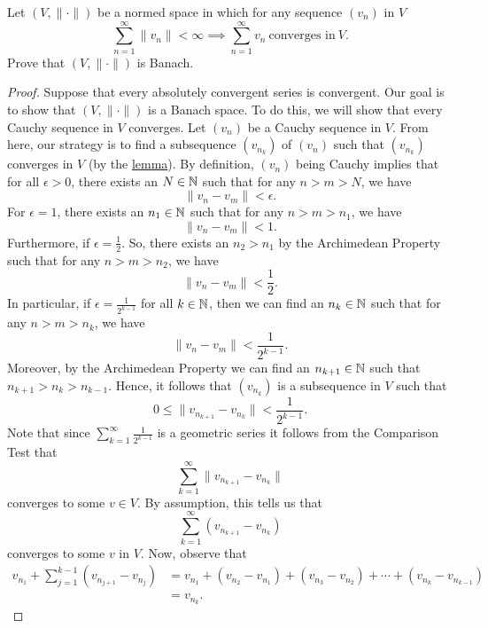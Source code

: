 \documentclass[a4paper]{article}
\begin{document}
\begin{problem}
   Let \( (V, \|\cdot\|) \) be a normed space in which for any sequence \( ({v}_{n}) \) in \( V  \)  
   \[  \sum_{ n=1  }^{ \infty  } \|{v}_{n}\| < \infty \implies \sum_{ n=1  }^{ \infty  } {v}_{n} \ \text{converges in} \ V.  \]
   Prove that \( (V , \|\cdot\|) \) is Banach.
\end{problem}
\begin{proof}
Suppose that every absolutely convergent series is convergent. Our goal is to show that \( (V, \|\cdot\|) \) is a Banach space. To do this, we will show that every Cauchy sequence in \( V  \) converges. Let \( ({v}_{n}) \) be a Cauchy sequence in \( V  \). From here, our strategy is to find a subsequence \( ({v}_{{n}_{k}}) \) of \( ({v}_{n}) \) such that \( ({v}_{{n}_{k}}) \) converges in \( V  \) (by the {\hyperref[lemma]{lemma}}). By definition, \( ({v}_{n}) \) being Cauchy implies that for all \( \epsilon > 0  \), there exists an \( N \in \mathbb{N} \) such that for any \( n > m > N  \), we have 
\[  \|{v}_{n} - {v}_{m}\| < \epsilon. \]
For \( \epsilon = 1 \), there exists an \( {n}_{1} \in \mathbb{N} \) such that for any \( n > m > {n}_{1} \), we have 
\[  \|{v}_{n} - {v}_{m}\| < 1. \]
Furthermore, if \( \epsilon = \frac{ 1 }{ 2 }   \). So, there exists an \( {n}_{2} > {n}_{1} \) by the Archimedean Property such that for any \( n > m > {n}_{2} \), we have 
\[  \|{v}_{n} - {v}_{m}\| < \frac{ 1 }{ 2 }. \] 
In particular, if \( \epsilon = \frac{ 1 }{ 2^{k-1} }   \) for all \( k \in \mathbb{N} \), then we can find an \( {n}_{k} \in \mathbb{N} \) 
such that for any \( n > m > {n}_{k}   \), we have 
\[  \|{v}_{n} - {v}_{m}\| < \frac{ 1 }{ 2^{k-1} }. \]
Moreover, by the Archimedean Property we can find an \( {n}_{k+1} \in \mathbb{N}    \) such that \( {n}_{k+1} > {n}_{k} > {n}_{k-1} \). Hence, it follows that \( ({v}_{{n}_{k}} ) \) is a subsequence in \( V  \) such that
\[   0 \leq  \|{v}_{{n}_{k+1}} - {v}_{{n}_{k}} \| < \frac{ 1 }{ 2^{k-1} }. \tag{*} \]
Note that since \( \sum_{ k=1  }^{ \infty  } \frac{ 1 }{ 2^{k-1} }  \) is a geometric series it follows from the Comparison Test that  
\[  \sum_{ k=1  }^{ \infty  } \|{v}_{{n}_{k+1}} - {v}_{{n}_{k}} \|   \]
converges to some \( v \in V  \). By assumption, this tells us that 
\[  \sum_{ k=1  }^{ \infty  } ({v}_{{n}_{k+1}} - {v}_{{n}_{k}})  \]
converges to some \( v  \) in \( V  \). Now, observe that 
\begin{align*}
    {v}_{{n}_{1}} + \sum_{ j=1  }^{ k - 1  } ({v}_{{n}_{j+1}} - {v}_{{n}_{j}}) &= {v}_{{n}_{1}} + ({v}_{{n}_{2}} - {v}_{{n}_{1}}) + ({v}_{{n}_{3}} - {v}_{{n}_{2}}) + \cdots + ({v}_{{n}_{k}} - {v}_{{n}_{k-1}}) \\ &= {v}_{{n}_{k}}.  

\end{align*}
\end{proof}
\end{document}
